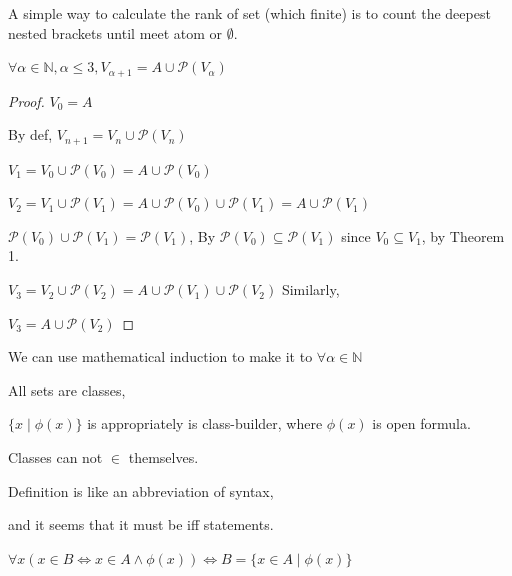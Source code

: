 \documentclass[12pt, a4paper, oneside]{article}
\begin{document}
    \begin{remark}
        A simple way to calculate the rank of set (which finite) is to count the deepest nested brackets until meet atom or $\emptyset$.
    \end{remark}

    \begin{theorem}
        $\forall \alpha \in \mathbb{N},\alpha \le 3, V_{\alpha + 1} = A \cup \mathscr{P}(V_{\alpha})$
    \end{theorem}
    
    \begin{proof}
        $V_0 = A$

        By def, $V_{n+1} = V_n \cup \mathscr{P}(V_n)$
        
        $V_1 = V_0 \cup \mathscr{P}(V_0) = A \cup \mathscr{P}(V_0)$

        $V_2 = V_1 \cup \mathscr{P}(V_1) = A \cup \mathscr{P}(V_0) \cup  \mathscr{P}(V_1) = A \cup \mathscr{P}(V_1)$
        
        $\mathscr{P}(V_0) \cup  \mathscr{P}(V_1) =  \mathscr{P}(V_1)$,
        By $\mathscr{P}(V_0) \subseteq \mathscr{P}(V_1)$ since $V_0 \subseteq V_1$, by Theorem 1.

        $V_3 = V_2 \cup \mathscr{P}(V_2) = A \cup \mathscr{P}(V_1) \cup  \mathscr{P}(V_2)$ Similarly,

        $V_3 = A \cup \mathscr{P}(V_2)$
    \end{proof}

    \begin{remark}
        We can use mathematical induction to make it to $\forall \alpha \in \mathbb{N}$
    \end{remark}

    \begin{remark}
        All sets are classes, 
        
        $\{x \mid \phi(x)\}$ is appropriately is class-builder, where $\phi(x)$ is open formula.

        Classes can not $\in$ themselves.
    \end{remark}

    \begin{remark}
        Definition is like an abbreviation of syntax,
        
        and it seems that it must be iff statements.
    \end{remark}

    \begin{remark}
        $\forall x (x\in B \iff x \in A \wedge \phi(x))  \iff B = \{x\in A \mid \phi(x)\}$
    \end{remark}
\end{document}

